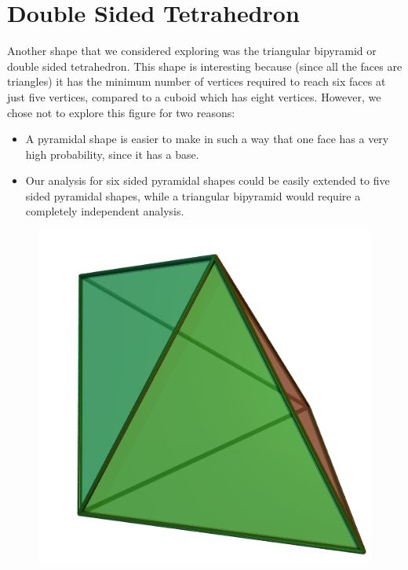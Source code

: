 \section{Double Sided Tetrahedron}
Another shape that we considered exploring was the triangular bipyramid or double sided tetrahedron. This shape is interesting because (since all the faces are triangles) it has the minimum number of vertices required to reach six faces at just five vertices, compared to a cuboid which has eight vertices. However, we chose not to explore this figure for two reasons:\\
\begin{itemize}
    \item A pyramidal shape is easier to make in such a way that one face has a very high probability, since it has a base.\\
    \item Our analysis for six sided pyramidal shapes could be easily extended to five sided pyramidal shapes, while a triangular bipyramid would require a completely independent analysis.\\
\end{itemize}
\begin{figure}[h]
\center
\includegraphics[scale=0.6]{DStetra.png}
\caption{}
\label{fig:DStetra}
\end{figure}